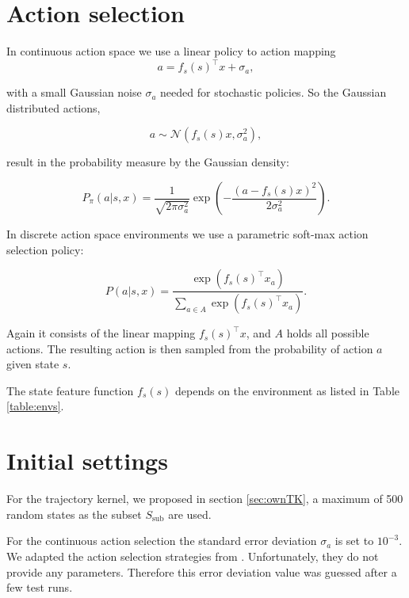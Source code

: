 \section{Action selection}
\label{sec:actionselection}
In continuous action space we use a linear policy to action mapping
\begin{equation} \label{eq:actionselection}
    a = f_s(s)^\top x + \sigma_a,
\end{equation}

with a small Gaussian noise $\sigma_a$ needed for stochastic policies. So the Gaussian distributed actions,

$$a \sim \mathcal{N}(f_s(s) x,\sigma_a^2),$$

result in the probability measure by the Gaussian density:

\begin{equation}\label{eq:contiAS}
    P_{\pi}(a|s,x) = \frac{1}{\sqrt{2\pi\sigma_a^2}}\exp\left(-\frac{(a-f_s(s)x)^2}{2\sigma_a^2}\right).
\end{equation}

In discrete action space environments we use a parametric soft-max action selection policy:

\begin{equation} \label{eq:discreteactionselection}
    P(a|s,x)= \frac{\exp(f_s(s)^\top x_a)}{\sum_{a\in A} \exp(f_s(s)^\top x_a)}.
\end{equation}

Again it consists of the linear mapping $f_s(s)^\top x$, and $A$ holds all possible actions. The resulting action is then sampled from the probability of action $a$ given state $s$.

The state feature function $f_s(s)$ depends on the environment as listed in Table \ref{table:envs}.

\section{Initial settings}

For the trajectory kernel, we proposed in section \ref{sec:ownTK}, a maximum of 500 random states as the subset $S_{\text{sub}}$ are used.

For the continuous action selection the standard error deviation $\sigma_a$ is set to $10^{-3}$. We adapted the action selection strategies from \cite{wilson2014using}. Unfortunately, they do not provide any parameters. Therefore this error deviation value was guessed after a few test runs.

